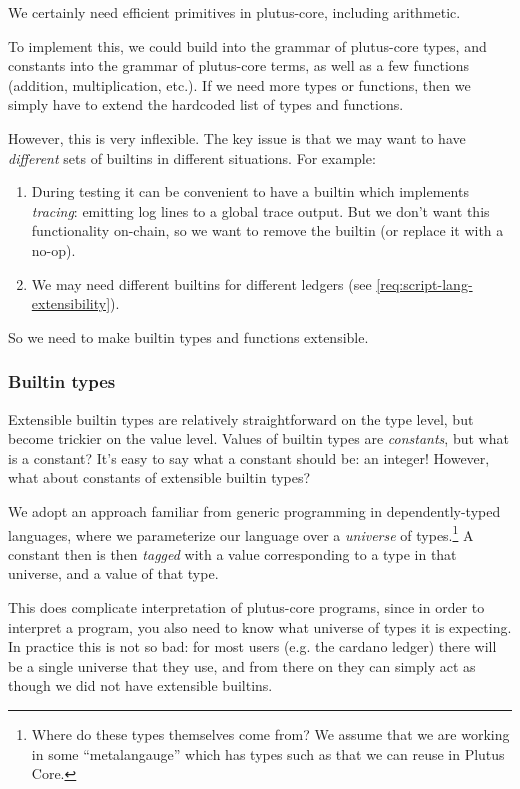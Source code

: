 We certainly need efficient primitives in \gls{plutus-core}, including arithmetic.

To implement this, we could build  into the grammar of \gls{plutus-core} types, and  constants into the grammar of \gls{plutus-core} terms, as well as a few functions (addition, multiplication, etc.).
If we need more types or functions, then we simply have to extend the hardcoded list of types and functions.

However, this is very inflexible.
The key issue is that we may want to have \emph{different} sets of builtins in different situations.
For example:
\begin{enumerate}
\item
  During testing it can be convenient to have a builtin which implements \emph{tracing}: emitting log lines to a global trace output.
  But we don't want this functionality on-chain, so we want to remove the builtin (or replace it with a no-op).
\item
  We may need different builtins for different ledgers (see \cref{req:script-lang-extensibility}).
\end{enumerate}

So we need to make builtin types and functions extensible.

\subsubsection{Builtin types}

Extensible builtin types are relatively straightforward on the type level, but become trickier on the value level.
Values of builtin types are \emph{constants}, but what is a constant?
It's easy to say what a  constant should be: an integer!
However, what about constants of extensible builtin types?

We adopt an approach familiar from generic programming in dependently-typed languages, where we parameterize our language over a \emph{universe} of types.\footnote{
  Where do these types themselves come from?
  We assume that we are working in some ``metalangauge'' which has types such as  that we can reuse in Plutus Core.
}
A constant then is then \emph{tagged} with a value corresponding to a type in that universe, and a value of that type.

This does complicate interpretation of \gls{plutus-core} programs, since in order to interpret a program, you also need to know what universe of types it is expecting.
In practice this is not so bad: for most users (e.g. the \gls{cardano} ledger) there will be a single universe that they use, and from there on they can simply act as though we did not have extensible builtins.

